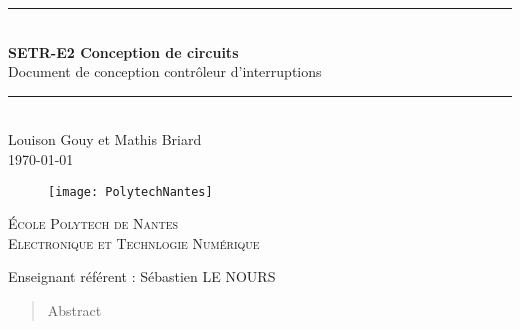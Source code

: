\newcommand{\HRule}{\rule{\linewidth}{0.5mm}} %

\vspace*{1cm}

\begin{center} %
	\HRule \\[0.2cm] %
	\Large
	\textbf{SETR-E2 Conception de circuits}\\ %
	\vspace{1cm}
Document de conception contrôleur d'interruptions \\

	\large
	\HRule \\[1.5cm] %
	\normalsize
	Louison Gouy et Mathis Briard\\
	\today %
\end{center}

\begin{figure}[H] %
	\centering
	\texttt{[image: PolytechNantes]}
\end{figure}

\vspace{2cm}

\begin{center}\large %
	\textsc{École Polytech de Nantes}\\
	\textsc{Electronique et Technlogie Numérique}
\end{center}

\vspace{2cm}

\noindent
Enseignant référent : Sébastien LE NOURS 
\vspace{2cm}

\begin{abstract}
Abstract
\end{abstract}
